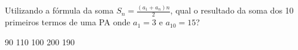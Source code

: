 Utilizando a fórmula da soma $S_n=\frac{(a_1+a_n)n}{2}$, qual o resultado da soma dos 10 primeiros termos de uma PA onde $a_1 = 3$ e $a_{10} = 15$?

90
110
100
200
190





